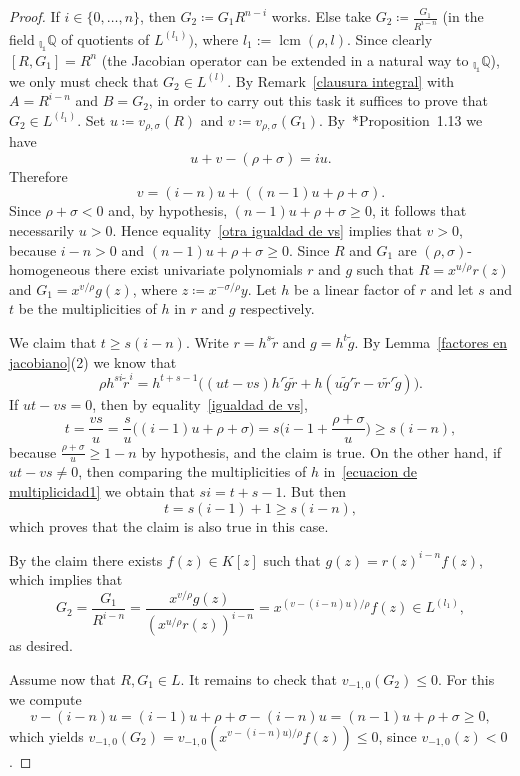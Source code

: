 \documentclass[reqno,a4paper]{amsart}
\theoremstyle{definition}
\theoremstyle{remark}
\DeclareMathOperator{\lcm}{lcm}
\begin{document}
\begin{proof} If $i\in \{0,\dots,n\}$, then $G_2\coloneqq G_1R^{n-i}$ works. Else take $G_2\coloneqq \frac{G_1}{R^{i-n}}$ (in the field $\mathds{{}_{l_1}Q}$ of quotients of $L^{(l_1)})$, where $l_1:=\lcm(\rho,l)$. Since clearly $[R,G_1]=R^n$ (the Jacobian operator can be extended in a natural way to $\mathds{{}_{l_1}Q}$), we only must check that $G_2\in L^{(l)}$. By Remark~\ref{clausura integral} with $A=R^{i-n}$ and $B=G_2$, in order to carry out this task it suffices to prove that $G_2\in L^{(l_1)}$. Set $u\coloneqq v_{\rho,\sigma}(R)$ and $v\coloneqq  v_{\rho,\sigma}(G_1)$. By~\cite{GGV}*{Proposition~1.13} we have
\begin{equation}\label{igualdad de vs}
u+v-(\rho+\sigma)=i u.
\end{equation}
Therefore
\begin{equation}\label{otra igualdad de vs}
v=(i-n)u+((n-1)u+\rho+\sigma).
\end{equation}
Since $\rho+\sigma<0$ and, by hypothesis, $(n-1)u+\rho+\sigma\ge 0$, it follows that necessarily $u>0$. Hence equality~\eqref{otra igualdad de vs} implies that $v>0$, because $i-n>0$ and $(n-1)u+\rho+\sigma\ge 0$. Since $R$ and $G_1$ are $(\rho,\sigma)$-homogeneous there exist univariate polynomials $r$ and $g$ such that $R= x^{u/\rho}r(z)$ and $G_1=x^{v/\rho}g(z)$, where $z\coloneqq  x^{-\sigma/\rho}y$. Let $h$ be a linear factor of $r$ and let $s$ and $t$ be the multiplicities of $h$ in $r$ and $g$ respectively.

We claim that $t\ge s(i-n)$. Write $r=h^s \tilde{r}$ and $g=h^t \tilde{g}$. By Lemma~\ref{factores en jacobiano}(2) we know that
\begin{equation}\label{ecuacion de multiplicidad1}
\rho h^{si}\tilde{r}^i = h^{t+s-1}\bigl((ut-vs)h'\tilde{g}\tilde{r} + h(u \tilde{g}' \tilde{r} - v\tilde{r}' \tilde{g})\bigr).
\end{equation}
If $ut-vs=0$, then by equality~\eqref{igualdad de vs},
$$
t=\frac{vs}{u}=\frac{s}{u} \bigl((i-1)u+\rho+\sigma\bigr)=s\Bigr(i-1+\frac{\rho+\sigma}{u}\Bigr)\ge s(i-n),
$$
because $\frac{\rho+\sigma}{u}\ge 1-n$ by hypothesis, and the claim is true. On the other hand, if $ut-vs\ne 0$, then comparing the multiplicities of $h$ in~\eqref{ecuacion de multiplicidad1} we obtain that $si=t+s-1$. But then
$$
t=s(i-1)+1\ge s(i-n),
$$
which proves that the claim is also true in this case.

\smallskip

By the claim there exists $f(z)\in K[z]$ such that $g(z)=r(z)^{i-n}f(z)$, which implies that
$$
G_2=\frac{G_1}{R^{i-n}}=\frac{x^{v/\rho}g(z)}{(x^{u/\rho}r(z))^{i-n}}=x^{(v-(i-n)u)/\rho}f(z)\in L^{(l_1)},
$$
as desired.

\smallskip

Assume now that $R,G_1\in L$. It remains to check that $v_{-1,0}(G_2)\le 0$. For this we compute
$$
v-(i-n)u=(i-1)u+\rho+\sigma-(i-n)u=(n-1)u+\rho+\sigma\ge 0,
$$
which yields $v_{-1,0}(G_2)=v_{-1,0}(x^{v-(i-n)u)/\rho}f(z))\le 0$, since $v_{-1,0}(z)<0$.
\end{proof}
\end{document}
